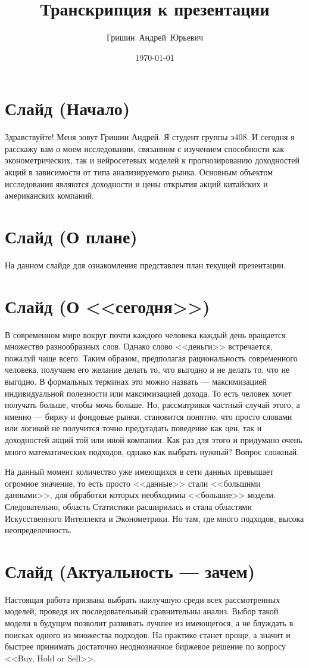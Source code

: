 \documentclass[a4paper, 12pt]{article}
\title{Транскрипция к презентации}
\author{Гришин~Андрей~Юрьевич}
\date{\today}
\begin{document}
	\maketitle
	\section{Слайд (Начало)}
		Здравствуйте! Меня зовут Гришин Андрей. Я студент группы э408. И сегодня я расскажу вам о моем исследовании, связанном с изучением способности как эконометрических, так и нейросетевых моделей к прогнозированию доходностей акций в зависимости от типа анализируемого рынка. Основным объектом исследования являются доходности и цены открытия акций китайских и американских компаний.
	\section{Слайд (О плане)}
		На данном слайде для ознакомления представлен план текущей презентации.
	\section{Слайд (О <<сегодня>>)}
		 В современном мире вокруг почти каждого человека каждый день вращается множество разнообразных слов. Однако слово <<деньги>> встречается, пожалуй чаще всего. Таким образом, предполагая рациональность современного человека, получаем его желание делать то, что выгодно и не делать то, что не выгодно. В формальных терминах это можно назвать --- максимизацией индивидуальной полезности или максимизацией дохода. То есть человек хочет получать больше, чтобы мочь больше. Но, рассматривая частный случай этого, а именно --- биржу и фондовые рынки, становится понятно, что просто словами или логикой не получится точно предугадать поведение как цен, так и доходностей акций той или иной компании. Как раз для этого и придумано очень много математических подходов, однако как выбрать нужный? Вопрос сложный.
		 
		 На данный момент количество уже имеющихся в сети данных превышает огромное значение, то есть просто <<данные>> стали <<большими данными>>, для обработки которых необходимы <<большие>> модели. Следовательно, область Статистики расширилась и стала областями Искусственного Интеллекта и Эконометрики. Но там, где много подходов, высока неопределенность. 
	\section{Слайд (Актуальность --- зачем)}
		Настоящая работа призвана выбрать наилучшую среди всех рассмотренных моделей, проведя их последовательный сравнительны анализ. Выбор такой модели в будущем позволит развивать лучшее из имеющегося, а не блуждать в поисках одного из множества подходов. На практике станет проще, а значит и быстрее принимать достаточно неоднозначное биржевое решение по вопросу <<Buy, Hold or Sell>>. 
\end{document}
